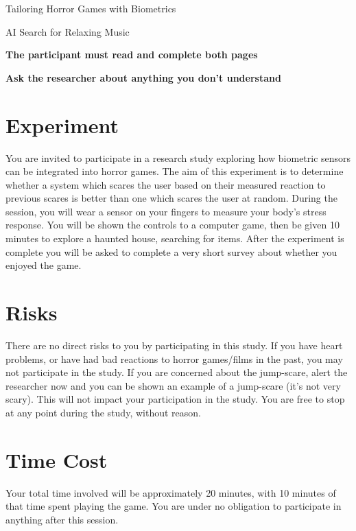\documentclass[a4paper]{article}
\begin{document}
	\begin{center}
		\setlength{\parskip}{\baselineskip}
		{\Huge Tailoring Horror Games with Biometrics}
		
		{\LARGE AI Search for Relaxing Music}
	\end{center}

	\begin{center}
		\textbf{The participant must read and complete both pages}
		
		\textbf{Ask the researcher about anything you don't understand}
	\end{center}
	
	\section{Experiment}
	
	You are invited to participate in a research study exploring how biometric sensors can be integrated into horror games. The aim of this experiment is to determine whether a system which scares the user based on their measured reaction to previous scares is better than one which scares the user at random. During the session, you will wear a sensor on your fingers to measure your body's stress response. You will be shown the controls to a computer game, then be given 10 minutes to explore a haunted house, searching for items. After the experiment is complete you will be asked to complete a very short survey about whether you enjoyed the game.
	
	\section{Risks}
	
	There are no direct risks to you by participating in this study. If you have heart problems, or have had bad reactions to horror games/films in the past, you may not participate in the study. If you are concerned about the jump-scare, alert the researcher now and you can be shown an example of a jump-scare (it's not very scary). This will not impact your participation in the study. You are free to stop at any point during the study, without reason.
	
	\section{Time Cost}
	
	Your total time involved will be approximately 20 minutes, with 10 minutes of that time spent playing the game. You are under no obligation to participate in anything after this session.
	
\end{document}
